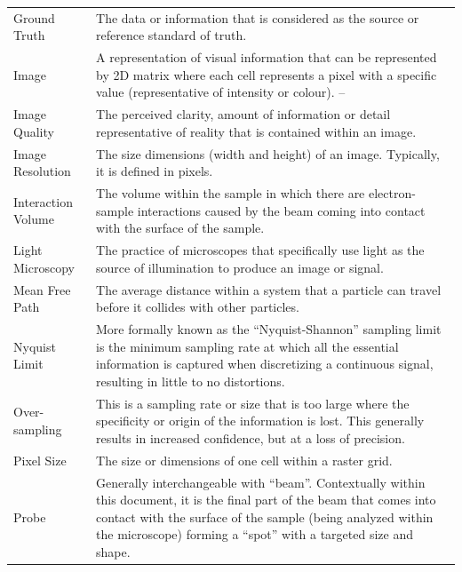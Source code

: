\documentclass[12pt]{article}
\begin{document}
\begin{center}
\begin{longtable}{p{4.25cm} p{11.25cm}}
        Ground Truth & The data or information that is considered as the source or reference standard of truth. \\
        
        Image & A representation of visual information that can be represented by 2D matrix where each cell represents a pixel with a specific value (representative of intensity or colour). -- \\
        
        Image Quality & The perceived clarity, amount of information or detail representative of reality that is contained within an image. \\
        
        Image Resolution & The size dimensions (width and height) of an image. Typically, it is defined in pixels. \\
        
        Interaction Volume & The volume within the sample in which there are electron-sample interactions caused by the beam coming into contact with the surface of the sample. \\
        
        Light Microscopy & The practice of microscopes that specifically use light as the source of illumination to produce an image or signal. \\

        Mean Free Path & The average distance within a system that a particle can travel before it collides with other particles.\\
        
        Nyquist Limit & More formally known as the ``Nyquist-Shannon'' sampling limit is the minimum sampling rate at which all the essential information is captured when discretizing a continuous signal, resulting in little to no distortions. \\
        
        Over-sampling & This is a sampling rate or size that is too large where the specificity or origin of the information is lost. This generally results in increased confidence, but at a loss of precision.\\
        
        Pixel Size & The size or dimensions of one cell within a raster grid. \\
        
        Probe & Generally interchangeable with ``beam''. Contextually within this document, it is the final part of the beam that comes into contact with the surface of the sample (being analyzed within the microscope) forming a ``spot'' with a targeted size and shape. \\
        

\end{longtable}
\end{center}
\end{document}
